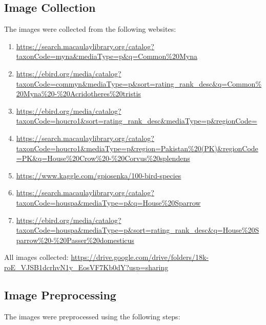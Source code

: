 \documentclass{article}
\begin{document}
    \subsection*{Image Collection}
    The images were collected from the following websites:
    \begin{enumerate}
        \item \url{https://search.macaulaylibrary.org/catalog?taxonCode=myna&mediaType=p&q=Common%20Myna}
        \item \url{https://ebird.org/media/catalog?taxonCode=commyn&mediaType=p&sort=rating_rank_desc&q=Common%20Myna%20-%20Acridotheres%20tristis}
        \item \url{https://ebird.org/media/catalog?taxonCode=houcro1&sort=rating_rank_desc&mediaType=p&regionCode=}
        \item \url{https://search.macaulaylibrary.org/catalog?taxonCode=houcro1&mediaType=p&region=Pakistan%20(PK)&regionCode=PK&q=House%20Crow%20-%20Corvus%20splendens}
        \item \url{https://www.kaggle.com/gpiosenka/100-bird-species}
        \item \url{https://search.macaulaylibrary.org/catalog?taxonCode=houspa&mediaType=p&q=House%20Sparrow}
        \item \url{https://ebird.org/media/catalog?taxonCode=houspa&mediaType=p&sort=rating_rank_desc&q=House%20Sparrow%20-%20Passer%20domesticus}
    \end{enumerate}     
    All images collected: \url{https://drive.google.com/drive/folders/18k-roE_VJSB1dcrhvN1y_EosVF7Kb0dY?usp=sharing}
    \subsection*{Image Preprocessing}
    The images were preprocessed using the following steps:
\end{document}
